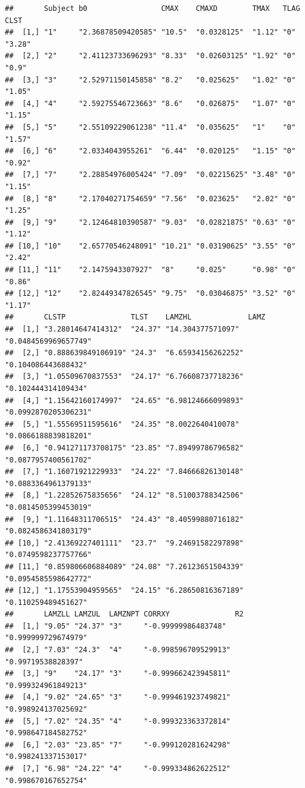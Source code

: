 \documentclass[12pt,]{krantz}
\theoremstyle{definition}
\theoremstyle{definition}
\theoremstyle{definition}
\theoremstyle{remark}
\begin{document}
\begin{verbatim}
##       Subject b0                 CMAX    CMAXD        TMAX   TLAG CLST  
##  [1,] "1"     "2.36878509420585" "10.5"  "0.0328125"  "1.12" "0"  "3.28"
##  [2,] "2"     "2.41123733696293" "8.33"  "0.02603125" "1.92" "0"  "0.9" 
##  [3,] "3"     "2.52971150145858" "8.2"   "0.025625"   "1.02" "0"  "1.05"
##  [4,] "4"     "2.59275546723663" "8.6"   "0.026875"   "1.07" "0"  "1.15"
##  [5,] "5"     "2.55109229061238" "11.4"  "0.035625"   "1"    "0"  "1.57"
##  [6,] "6"     "2.0334043955261"  "6.44"  "0.020125"   "1.15" "0"  "0.92"
##  [7,] "7"     "2.28854976005424" "7.09"  "0.02215625" "3.48" "0"  "1.15"
##  [8,] "8"     "2.17040271754659" "7.56"  "0.023625"   "2.02" "0"  "1.25"
##  [9,] "9"     "2.12464810390587" "9.03"  "0.02821875" "0.63" "0"  "1.12"
## [10,] "10"    "2.65770546248091" "10.21" "0.03190625" "3.55" "0"  "2.42"
## [11,] "11"    "2.1475943307927"  "8"     "0.025"      "0.98" "0"  "0.86"
## [12,] "12"    "2.82449347826545" "9.75"  "0.03046875" "3.52" "0"  "1.17"
##       CLSTP               TLST    LAMZHL             LAMZ                
##  [1,] "3.28014647414312"  "24.37" "14.304377571097"  "0.0484569969657749"
##  [2,] "0.888639849106919" "24.3"  "6.65934156262252" "0.104086443688432" 
##  [3,] "1.05509670837553"  "24.17" "6.76608737718236" "0.102444314109434" 
##  [4,] "1.15642160174997"  "24.65" "6.98124666099893" "0.0992870205306231"
##  [5,] "1.55569511595616"  "24.35" "8.0022640410078"  "0.0866188839818201"
##  [6,] "0.941271173708175" "23.85" "7.89499786796582" "0.0877957400561702"
##  [7,] "1.16071921229933"  "24.22" "7.84666826130148" "0.0883364961379133"
##  [8,] "1.22852675835656"  "24.12" "8.51003788342506" "0.0814505399453019"
##  [9,] "1.11648311706515"  "24.43" "8.40599880716182" "0.0824586341803179"
## [10,] "2.41369227401111"  "23.7"  "9.24691582297898" "0.0749598237757766"
## [11,] "0.859806606884089" "24.08" "7.26123651504339" "0.0954585598642772"
## [12,] "1.17553904959565"  "24.15" "6.28650816367189" "0.110259489451627" 
##       LAMZLL LAMZUL  LAMZNPT CORRXY               R2                 
##  [1,] "9.05" "24.37" "3"     "-0.99999986483748"  "0.999999729674979"
##  [2,] "7.03" "24.3"  "4"     "-0.998596709529913" "0.99719538828397" 
##  [3,] "9"    "24.17" "3"     "-0.999662423945811" "0.999324961849213"
##  [4,] "9.02" "24.65" "3"     "-0.999461923749821" "0.998924137025692"
##  [5,] "7.02" "24.35" "4"     "-0.999323363372814" "0.998647184582752"
##  [6,] "2.03" "23.85" "7"     "-0.999120281624298" "0.998241337153017"
##  [7,] "6.98" "24.22" "4"     "-0.999334862622512" "0.998670167652754"

\end{verbatim}
\end{document}
